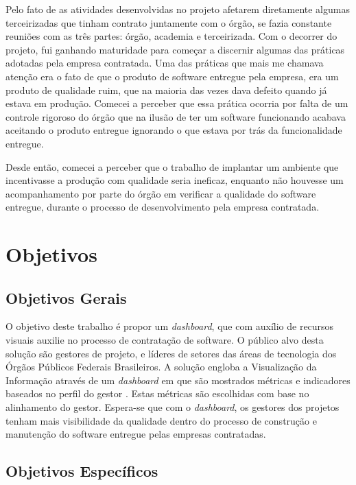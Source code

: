 	Pelo fato de as atividades desenvolvidas no projeto afetarem diretamente algumas terceirizadas que tinham contrato juntamente com o órgão, se fazia constante reuniões com as três partes: órgão, academia e terceirizada. Com o decorrer do projeto, fui ganhando maturidade para começar a discernir algumas das práticas adotadas pela empresa contratada. Uma das práticas que mais me chamava atenção era o fato de que o produto de software entregue pela empresa, era um produto de qualidade ruim, que na maioria das vezes dava defeito quando já estava em produção. Comecei a perceber que essa prática ocorria por falta de um controle rigoroso do órgão que na ilusão de ter um software funcionando acabava aceitando o produto entregue ignorando o que estava por trás da funcionalidade entregue.
	
	Desde então, comecei a perceber que o trabalho de implantar um ambiente que incentivasse a produção com qualidade seria ineficaz, enquanto não houvesse um acompanhamento por parte do órgão em verificar a qualidade do software entregue, durante o processo de desenvolvimento pela empresa contratada.


	\section{Objetivos}

	\subsection{Objetivos Gerais} %
	\label{sub:objetivos_gerais}
	
	O objetivo deste trabalho é propor um \textit{dashboard}, que com auxílio de recursos visuais auxilie no processo de contratação de software. O público alvo desta solução são gestores de projeto, e líderes de setores das áreas de tecnologia dos Órgãos Públicos Federais Brasileiros. A solução engloba a Visualização da Informação através de um \textit{dashboard} em que são mostrados métricas e indicadores baseados no perfil do gestor . Estas métricas são escolhidas com base no alinhamento do gestor. Espera-se que com o \textit{dashboard}, os gestores dos projetos tenham mais visibilidade da qualidade dentro do processo de construção e manutenção do software entregue pelas empresas contratadas.


	\subsection{Objetivos Específicos} %
	\label{sub:objetivos_específicos}

